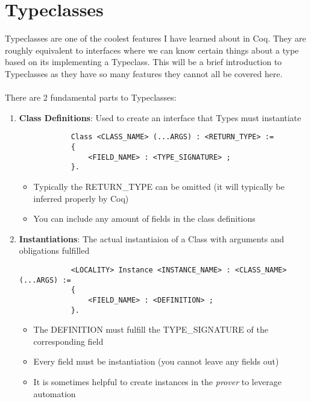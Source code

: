 \documentclass{article}
\begin{document}
    \section{Typeclasses}
    Typeclasses are one of the coolest features I have learned about in Coq. They are roughly equivalent to interfaces where we can know certain things about a type based on its implementing a Typeclass. 
    This will be a brief introduction to Typeclasses as they have so many features they cannot all be covered here.
    \\~\\
    There are 2 fundamental parts to Typeclasses:
    \begin{enumerate}
        \item \textbf{Class Definitions}: Used to create an interface that Types must instantiate
        \begin{verbatim}
            Class <CLASS_NAME> (...ARGS) : <RETURN_TYPE> := 
            {
                <FIELD_NAME> : <TYPE_SIGNATURE> ; 
            }.
        \end{verbatim} 
        
        \begin{itemize}
            \item Typically the RETURN\_TYPE can be omitted (it will typically be inferred properly by Coq)
            \item You can include any amount of fields in the class definitions
        \end{itemize} 

        \item \textbf{Instantiations}: The actual instantiaion of a Class with arguments and obligations fulfilled
        \begin{verbatim}
            <LOCALITY> Instance <INSTANCE_NAME> : <CLASS_NAME> (...ARGS) :=
            {
                <FIELD_NAME> : <DEFINITION> ;
            }.
        \end{verbatim}
        \begin{itemize}
            \item The DEFINITION must fulfill the TYPE\_SIGNATURE of the corresponding field
            \item Every field must be instantiation (you cannot leave any fields out)
            \item It is sometimes helpful to create instances in the \emph{prover} to leverage automation
        \end{itemize}
    \end{enumerate}
\end{document}
